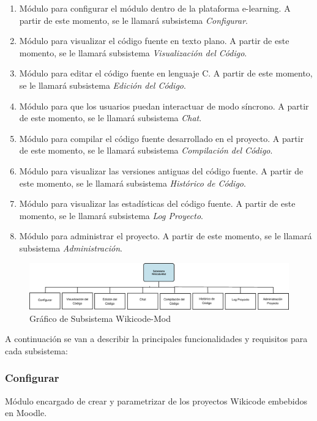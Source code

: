 \begin{enumerate}
	\item Módulo para configurar el módulo dentro de la plataforma e-learning. A partir de este momento, se le llamará subsistema \emph{Configurar}.
	\item Módulo para visualizar el código fuente en texto plano. A partir de este momento, se le llamará subsistema \emph{Visualización del Código}.
	\item Módulo para editar el código fuente en lenguaje C. A partir de este momento, se le llamará subsistema \emph{Edición del Código}.
	\item Módulo para que los usuarios puedan interactuar de modo síncrono. A partir de este momento, se le llamará subsistema \emph{Chat}.
	\item Módulo para compilar el código fuente desarrollado en el proyecto. A partir de este momento, se le llamará subsistema \emph{Compilación del Código}.
	\item Módulo para visualizar las versiones antiguas del código fuente. A partir de este momento, se le llamará subsistema \emph{Histórico de Código}.
	\item Módulo para visualizar las estadísticas del código fuente. A partir de este momento, se le llamará subsistema \emph{Log Proyecto}.
	\item Módulo para administrar el proyecto. A partir de este momento, se le llamará subsistema \emph{Administración}.
\end{enumerate}

\begin{figure}[h]
	\includegraphics[width=\textwidth]{./img/c3-sub-mod.eps}
	\caption{Gráfico de Subsistema Wikicode-Mod}
\end{figure}

A continuación se van a describir la principales funcionalidades y requisitos para cada subsistema:

\subsubsection{Configurar}

Módulo encargado de crear y parametrizar de los proyectos Wikicode embebidos en Moodle. 

